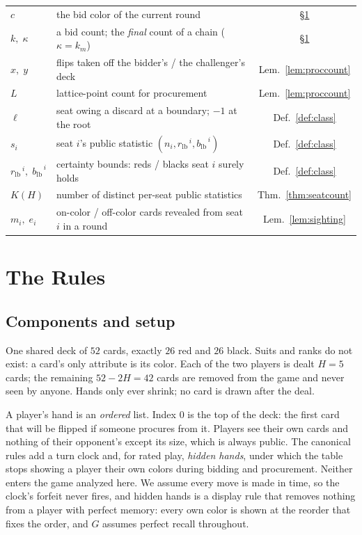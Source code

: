 \documentclass[11pt]{article}
\theoremstyle{plain}
\theoremstyle{definition}
\theoremstyle{remark}
\newcommand{\rlb}{\ensuremath{r_{\mathrm{lb}}}}
\newcommand{\blb}{\ensuremath{b_{\mathrm{lb}}}}
\begin{document}
\begin{table}[htbp]
\begin{tabular}{@{}llc@{}}
$c$ & the bid color of the current round & \S\ref{sec:rules}\\
$k,\;\kappa$ & a bid count; the \emph{final} count of a chain ($\kappa=k_m$) & \S\ref{sec:rules}\\
$x,\;y$ & flips taken off the bidder's / the challenger's deck & Lem.~\ref{lem:proccount}\\
$L$ & lattice-point count for procurement & Lem.~\ref{lem:proccount}\\
$\ell$ & seat owing a discard at a boundary; $-1$ at the root & Def.~\ref{def:class}\\
$s_i$ & seat $i$'s public statistic $(n_i,\rlb^{\,i},\blb^{\,i})$ & Def.~\ref{def:class}\\
$\rlb^{\,i},\;\blb^{\,i}$ & certainty bounds: reds / blacks seat $i$ surely holds & Def.~\ref{def:class}\\
$K(H)$ & number of distinct per-seat public statistics & Thm.~\ref{thm:seatcount}\\
$m_i,\;e_i$ & on-color / off-color cards revealed from seat $i$ in a round & Lem.~\ref{lem:sighting}\\
\bottomrule
\end{tabular}
\end{table}

\section{The Rules}\label{sec:rules}

\subsection{Components and setup}

One shared deck of $52$ cards, exactly $26$ \textcolor{rbred}{red} and $26$
\textcolor{rbblack}{black}. Suits and ranks do not exist: a card's only
attribute is its color. Each of the two players is dealt $H=5$ cards; the
remaining $52-2H=42$ cards are removed from the game and never seen by
anyone. Hands only ever shrink; no card is drawn after the deal.

A player's hand is an \emph{ordered} list. Index $0$ is the top of the
deck: the first card that will be flipped if someone procures from it.
Players see their own cards and nothing of their opponent's except its
size, which is always public. The canonical rules add a turn clock and,
for rated play, \emph{hidden hands}, under which the table stops showing
a player their own colors during bidding and procurement. Neither enters
the game analyzed here. We assume every move is made in time, so the
clock's forfeit never fires, and hidden hands is a display rule that
removes nothing from a player with perfect memory: every own color is
shown at the reorder that fixes the order, and $G$ assumes perfect
recall throughout.
\end{document}
